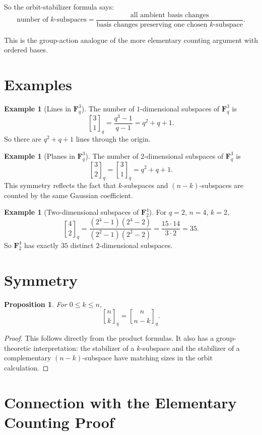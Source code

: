 \documentclass[11pt]{article}
\newtheorem{proposition}[theorem]{Proposition}
\theoremstyle{definition}
\newtheorem{example}[theorem]{Example}
\theoremstyle{remark}
\newcommand{\F}{\mathbf{F}}
\newcommand{\qbinom}[2]{\genfrac{[}{]}{0pt}{}{#1}{#2}_q}
\begin{document}
	So the orbit-stabilizer formula says:
	\[
	\text{number of \(k\)-subspaces}
	=
	\frac{\text{all ambient basis changes}}{\text{basis changes preserving one chosen \(k\)-subspace}}.
	\]
	
	This is the group-action analogue of the more elementary counting argument with ordered bases.
	
	\section{Examples}
	
	\begin{example}[Lines in \(\F_q^3\)]
		The number of \(1\)-dimensional subspaces of \(\F_q^3\) is
		\[
		\qbinom{3}{1}=\frac{q^3-1}{q-1}=q^2+q+1.
		\]
		So there are \(q^2+q+1\) lines through the origin.
	\end{example}
	
	\begin{example}[Planes in \(\F_q^3\)]
		The number of \(2\)-dimensional subspaces of \(\F_q^3\) is
		\[
		\qbinom{3}{2}=\qbinom{3}{1}=q^2+q+1.
		\]
		This symmetry reflects the fact that \(k\)-subspaces and \((n-k)\)-subspaces are counted by the same Gaussian coefficient.
	\end{example}
	
	\begin{example}[Two-dimensional subspaces of \(\F_2^4\)]
		For \(q=2\), \(n=4\), \(k=2\),
		\[
		\qbinom{4}{2}
		=
		\frac{(2^4-1)(2^4-2)}{(2^2-1)(2^2-2)}
		=
		\frac{15\cdot 14}{3\cdot 2}
		=
		35.
		\]
		So \(\F_2^4\) has exactly \(35\) distinct \(2\)-dimensional subspaces.
	\end{example}
	
	\section{Symmetry}
	
	\begin{proposition}
		For \(0\le k\le n\),
		\[
		\qbinom{n}{k}=\qbinom{n}{n-k}.
		\]
	\end{proposition}
	
	\begin{proof}
		This follows directly from the product formulas. It also has a group-theoretic interpretation: the stabilizer of a \(k\)-subspace and the stabilizer of a complementary \((n-k)\)-subspace have matching sizes in the orbit calculation.
	\end{proof}
	
	\section{Connection with the Elementary Counting Proof}
	
\end{document}
